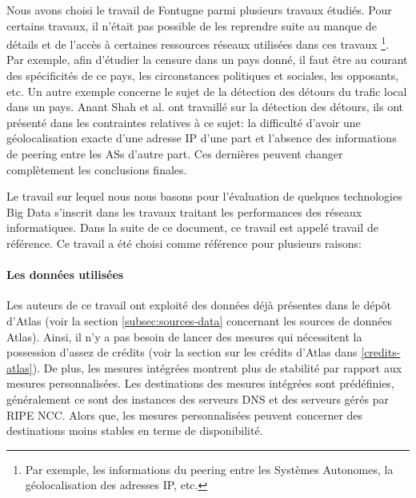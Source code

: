 
Nous avons choisi le travail \cite{DBLP:journals/corr/FontugneAPB16} de Fontugne parmi plusieurs travaux étudiés. Pour certains travaux, il n'était pas possible  de les reprendre suite au manque de détails et de l'accès à  certaines ressources réseaux utilisées dans ces travaux \footnote{Par exemple, les informations du peering entre les Systèmes Autonomes, la géolocalisation des adresses IP, etc.}. Par exemple, afin d'étudier la censure dans un pays donné, il faut être au courant des spécificités de ce pays, les circonstances politiques et sociales, les opposants,  etc.  Un autre exemple concerne le sujet de la détection des détours du trafic local dans un pays.  Anant Shah  et al. ont travaillé sur la détection des détours, ils ont présenté dans  \cite{anant-shah} les contraintes relatives à ce sujet: la difficulté d'avoir une géolocalisation exacte d'une adresse IP d'une part et l'absence des informations de peering entre les ASs d'autre part. Ces dernières peuvent changer complètement les conclusions finales. 

Le travail sur lequel nous nous basons \cite{DBLP:journals/corr/FontugneAPB16} pour l'évaluation de quelques technologies Big Data s'inscrit dans les travaux traitant les performances des réseaux informatiques. Dans la suite de ce document, ce travail est appelé  travail de référence.  Ce travail a été choisi comme référence pour plusieurs raisons:



\paragraph{Les données utilisées}  Les auteurs de ce travail ont exploité des données déjà présentes dans le dépôt d'Atlas (voir la section \ref{subsec:sources-data} concernant les sources de données Atlas). Ainsi, il n'y a pas besoin de lancer des mesures qui nécessitent la possession d'assez de crédits (voir la section sur les crédits d'Atlas dans \ref{credits-atlas}). De plus, les mesures intégrées montrent plus de stabilité par rapport aux mesures personnalisées. Les destinations des mesures intégrées sont prédéfinies, généralement ce sont des instances des serveurs DNS et des serveurs gérés par  RIPE NCC. Alors que, les mesures personnalisées peuvent concerner des destinations moins stables en terme de disponibilité.

